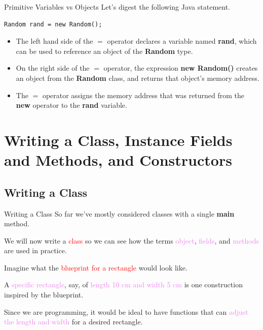 \documentclass[11pt]{beamer}
\newcommand{\red}[1]{\textcolor{red}{#1}}
\newcommand{\violet}[1]{\textcolor{violet}{#1}}
\begin{document}
\begin{frame}[fragile]{Primitive Variables vs Objects}
    Let's digest the following Java statement.
    \begin{lstlisting}
Random rand = new Random();
    \end{lstlisting}
    \begin{itemize}
        \item The left hand side of the $=$ operator declares a variable named \textbf{rand}, which can be used to reference an object of the \textbf{Random} type.
        \item On the right side of the $=$ operator, the expression \textbf{new Random()} creates an object from the \textbf{Random} class, and returns that object’s memory address.
        \item  The $=$ operator assigns the memory address that was returned from the \textbf{new} operator to the \textbf{rand} variable.
    \end{itemize}
\end{frame}

\section{Writing a Class, Instance Fields and Methods, and Constructors}
\subsection{Writing a Class}
\begin{frame}{Writing a Class}
    So far we've mostly considered classes with a single \textbf{main} method. \\ \vspace{1em}
    
    We will now write a \red{class} so we can see how the terms \violet{object}, \violet{fields}, and \violet{methods} are used in practice. \\ \vspace{1em}
    
    Imagine what the \red{blueprint for a rectangle} would look like. \\ \vspace{1em} 
    
    A \violet{specific rectangle}, say, of \violet{length 10 cm and width 5 cm} is one construction inspired by the blueprint. \\ \vspace{1em}
    
    Since we are programming, it would be ideal to have functions that can \violet{adjust the length and width} for a desired rectangle.
\end{frame}
\end{document}
